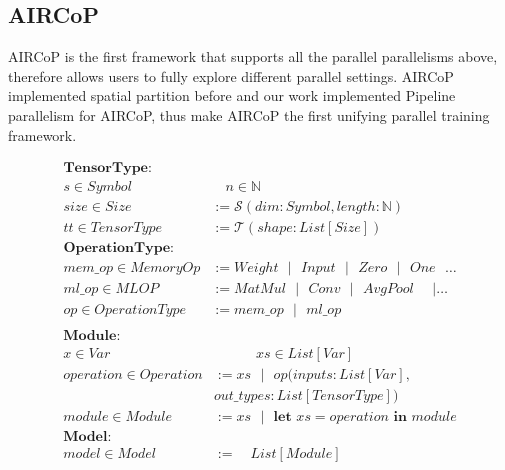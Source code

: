 \documentclass[sigplan, nonacm]{acmart}\settopmatter{printfolios=true,printccs=false,printacmref=false}
\begin{document}
\subsection{AIRCoP}
 AIRCoP \cite{aircopfeiwang} is the first framework that supports all the parallel parallelisms above, therefore allows users to fully explore different parallel settings. AIRCoP implemented spatial partition before and our work implemented Pipeline parallelism for AIRCoP, thus make AIRCoP the first unifying parallel training framework.\par
\begin{align*}\label{formalsyntax}
  \textbf{TensorType}:& \\
  s \in Symbol& \quad n  \in \mathbb{N} \\
  size \in Size& :=\mathcal{S}(dim:Symbol,length:\mathbb{N})\\
  tt\in TensorType& := \mathcal{T}(shape:List[Size])\\
  \textbf{OperationType}:& \\
  mem\_op\in MemoryOp& := Weight \text{ } | \text{ } Input \text{ } | \text{ } Zero \text{ } | \text{ } One \text{ } \dots \\
  ml\_op \in MLOP& := MatMul \text{ } | \text{ } Conv \text{ } | \text{ } AvgPool \text{ }\text{ } | \dots \\
  op \in OperationType&:= mem\_op \text{ } | \text{ } ml\_op \\
\end{align*}
\begin{align*}
  \textbf{Module}:& \\
  x \in Var& \quad \quad \quad xs \in List[Var]\\
  operation \in Operation&:= xs \text{ } | \text{ } op(inputs: List[Var], \\
  & out\_types:List[TensorType]) \\
  module \in Module&:=xs \text{ } | \text{ } \textbf{let } xs=operation \textbf{ in } module \\
  \textbf{Model}:&\\
  model \in Model&:= \quad List[Module]
\end{align*}
\end{document}
